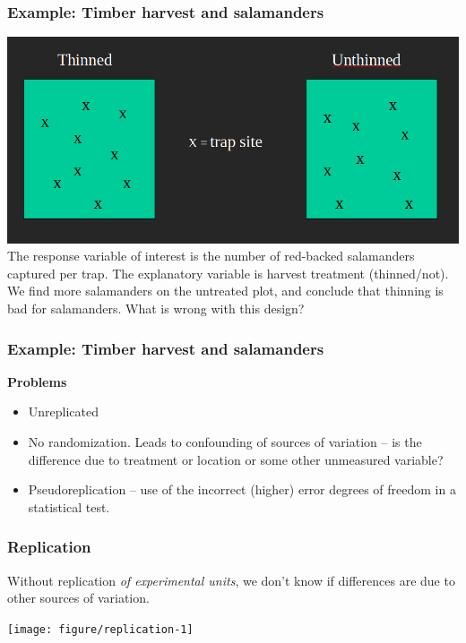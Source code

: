 \documentclass[color=usenames,dvipsnames]{beamer}\usepackage[]{graphicx}\usepackage[]{color}
\newenvironment{knitrout}{}{} %
\begin{document}
\begin{frame}
  \frametitle{Example: Timber harvest and salamanders}
  \includegraphics[width=\textwidth]{salamander-design} \\
  \vfill
  The response variable of interest is the number of red-backed
  salamanders captured per trap.  The explanatory variable is harvest
  treatment (thinned/not). We find more salamanders on the untreated
  plot, and conclude that thinning is bad for salamanders.  What is
  wrong with this design?  
\end{frame}


\begin{frame}
  \frametitle{Example: Timber harvest and salamanders}
  {\bf Problems}
  \begin{itemize}
    \item Unreplicated
    \item No randomization. Leads to confounding of sources of
      variation -- is the difference due to treatment or location or
      some other unmeasured variable?
    \item Pseudoreplication -- use of the incorrect (higher) error
      degrees of freedom in a statistical test. 
  \end{itemize}
\end{frame}


\begin{frame}[fragile]
  \frametitle{Replication}
  Without replication {\it of experimental units}, we don't know if
  differences are due to other sources of variation. \\
  \vfill
\begin{knitrout}\scriptsize
{}\color{fgcolor}

{\centering \texttt{[image: figure/replication-1]} 

}


\end{knitrout}
\end{frame}
\end{document}
